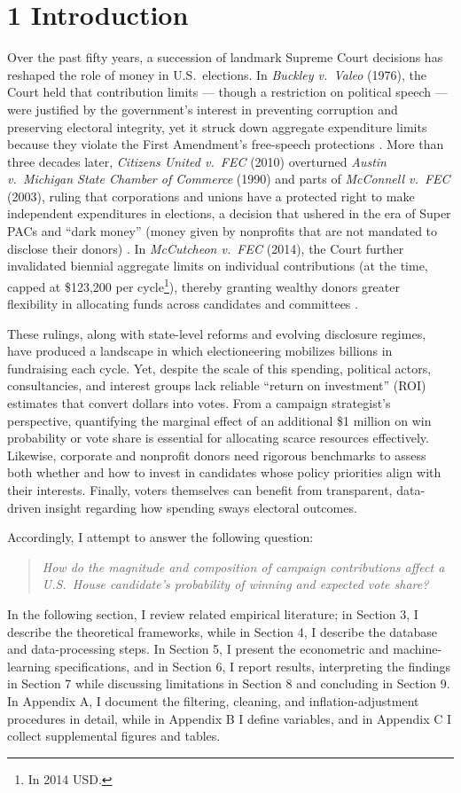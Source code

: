 \section*{1 Introduction}

\indent Over the past fifty years, a succession of landmark Supreme Court decisions has reshaped the role of money in U.S.\ elections. In \textit{Buckley v.\ Valeo} (1976), the Court held that contribution limits --- though a restriction on political speech --- were justified by the government's interest in preventing corruption and preserving electoral integrity, yet it struck down aggregate expenditure limits because they violate the First Amendment's free-speech protections \cite{buckley1976}. More than three decades later, \textit{Citizens United v.\ FEC} (2010) overturned \textit{Austin v.\ Michigan State Chamber of Commerce} (1990) and parts of \textit{McConnell v.\ FEC} (2003), ruling that corporations and unions have a protected right to make independent expenditures in elections, a decision that ushered in the era of Super PACs and ``dark money'' (money given by nonprofits that are not mandated to disclose their donors) \cite{citizensunited2010}. In \textit{McCutcheon v.\ FEC} (2014), the Court further invalidated biennial aggregate limits on individual contributions (at the time, capped at \$123,200 per cycle\footnote{In 2014 USD.}), thereby granting wealthy donors greater flexibility in allocating funds across candidates and committees \cite{mccutcheon2014}. 

\indent These rulings, along with state-level reforms and evolving disclosure regimes, have produced a landscape in which electioneering mobilizes billions in fundraising each cycle. Yet, despite the scale of this spending, political actors, consultancies, and interest groups lack reliable ``return on investment'' (ROI) estimates that convert dollars into votes. From a campaign strategist's perspective, quantifying the marginal effect of an additional \$1 million on win probability or vote share is essential for allocating scarce resources effectively. Likewise, corporate and nonprofit donors need rigorous benchmarks to assess both whether and how to invest in candidates whose policy priorities align with their interests. Finally, voters themselves can benefit from transparent, data-driven insight regarding how spending sways electoral outcomes.

\indent Accordingly, I attempt to answer the following question: \begin{quote} \emph{How do the magnitude and composition of campaign contributions affect a U.S.\ House candidate's probability of winning and expected vote share?} \end{quote} In the following section, I review related empirical literature; in Section 3, I describe the theoretical frameworks, while in Section 4, I describe the database and data-processing steps. In Section 5, I present the econometric and machine-learning specifications, and in Section 6, I report results, interpreting the findings in Section 7 while discussing limitations in Section 8 and concluding in Section 9. In Appendix A, I document the filtering, cleaning, and inflation-adjustment procedures in detail, while in Appendix B I define variables, and in Appendix C I collect supplemental figures and tables.
